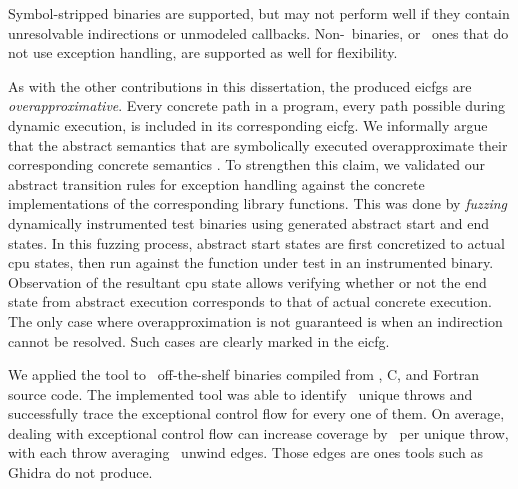 Symbol-stripped binaries are supported, but may not perform well if they contain unresolvable indirections or unmodeled callbacks.
Non-\Cpp\ binaries, or \Cpp\ ones that do not use exception handling, are supported as well for flexibility.

As with the other contributions in this dissertation, the produced \acp{eicfg} are \emph{overapproximative}.
Every concrete path in a program, every path possible during dynamic execution, is included in its corresponding \ac{eicfg}.
We informally argue that the abstract semantics that are symbolically executed overapproximate their corresponding concrete semantics \autocite{cousot1996abstract}.
To strengthen this claim, we validated our abstract transition rules for exception handling against the concrete implementations of the corresponding library functions.
This was done by \emph{fuzzing} dynamically instrumented test binaries using generated abstract start and end states.
In this fuzzing process, abstract start states are first concretized to actual \ac{cpu} states, then run against the function under test in an instrumented binary.
Observation of the resultant \ac{cpu} state allows verifying whether or not the end state from abstract execution corresponds to that of actual concrete execution.
The only case where overapproximation is not guaranteed is when an indirection cannot be resolved.
Such cases are clearly marked in the \ac{eicfg}.

We applied the tool to \totalbins\ off-the-shelf binaries compiled from \Cpp, C, and Fortran source code.
The implemented tool was able to identify \uniquethrows\ unique throws and successfully trace the exceptional control flow for every one of them.
On average, dealing with exceptional control flow can increase coverage by \avgdiffinst\ per unique throw, with each throw averaging \avgunwinds\ unwind edges.
Those edges are ones tools such as Ghidra \autocite{ghidra} do not produce.

